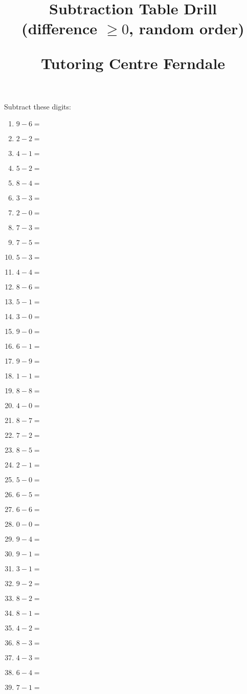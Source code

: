 \documentclass{article}
\title{Subtraction Table Drill\\(difference $\geq 0$, random order)\\
\begin{normalsize}
Tutoring Centre Ferndale
\end{normalsize}}
\author{}
\date{}
\begin{document}
\maketitle

\noindent Subtract these digits:

\begin{multicols}{4}
\begin{enumerate}

\item $9 - 6 =$
\item $2 - 2 =$
\item $4 - 1 =$
\item $5 - 2 =$
\item $8 - 4 =$
\item $3 - 3 =$
\item $2 - 0 =$
\item $7 - 3 =$
\item $7 - 5 =$
\item $5 - 3 =$
\item $4 - 4 =$
\item $8 - 6 =$
\item $5 - 1 =$
\item $3 - 0 =$
\item $9 - 0 =$
\item $6 - 1 =$
\item $9 - 9 =$
\item $1 - 1 =$
\item $8 - 8 =$
\item $4 - 0 =$
\item $8 - 7 =$
\item $7 - 2 =$
\item $8 - 5 =$
\item $2 - 1 =$
\item $5 - 0 =$
\item $6 - 5 =$
\item $6 - 6 =$
\item $0 - 0 =$
\item $9 - 4 =$
\item $9 - 1 =$
\item $3 - 1 =$
\item $9 - 2 =$
\item $8 - 2 =$
\item $8 - 1 =$
\item $4 - 2 =$
\item $8 - 3 =$
\item $4 - 3 =$
\item $6 - 4 =$
\item $7 - 1 =$

\end{enumerate}
\end{multicols}
\end{document}

